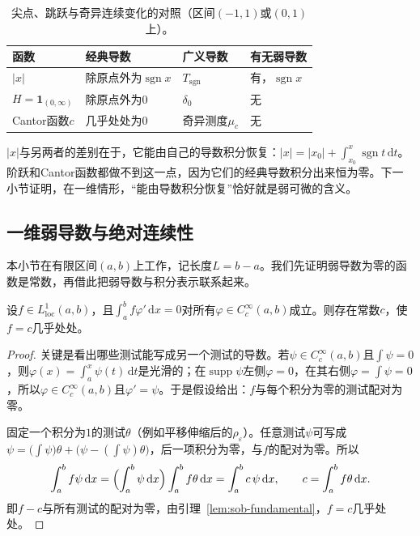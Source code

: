\begin{table}[!htb]
 \centering
 \caption{尖点、跳跃与奇异连续变化的对照（区间$(-1,1)$或$(0,1)$上）。}
 \label{tab:sob-three-examples}
 \begin{tabular}{@{}llll@{}}
  \toprule
  函数 & 经典导数 & 广义导数 & 有无弱导数\\
  \midrule
  $|x|$ & 除原点外为$\operatorname{sgn}x$ & $T_{\operatorname{sgn}}$ & 有，$\operatorname{sgn}x$\\
  $H=\mathbf 1_{(0,\infty)}$ & 除原点外为$0$ & $\delta_0$ & 无\\
  Cantor函数$c$ & 几乎处处为$0$ & 奇异测度$\mu_c$ & 无\\
  \bottomrule
 \end{tabular}
\end{table}

$|x|$与另两者的差别在于，它能由自己的导数积分恢复：$|x|=|x_0|+\int_{x_0}^x\operatorname{sgn}t\,\mathrm dt$。阶跃和Cantor函数都做不到这一点，因为它们的经典导数积分出来恒为零。下一小节证明，在一维情形，“能由导数积分恢复”恰好就是弱可微的含义。

\subsection{一维弱导数与绝对连续性}
\label{sec:sob-absolute-continuity}

本小节在有限区间$(a,b)$上工作，记长度$L=b-a$。我们先证明弱导数为零的函数是常数，再借此把弱导数与积分表示联系起来。

\begin{lemma}[弱导数为零的函数]
\label{lem:sob-zero-derivative}
设$f\in L^1_{\mathrm{loc}}(a,b)$，且$\int_a^bf\varphi'\,\mathrm dx=0$对所有$\varphi\in C_c^\infty(a,b)$成立。则存在常数$c$，使$f=c$几乎处处。
\end{lemma}

\begin{proof}
关键是看出哪些测试能写成另一个测试的导数。若$\psi\in C_c^\infty(a,b)$且$\int\psi=0$，则$\varphi(x)=\int_a^x\psi(t)\,\mathrm dt$是光滑的；在$\operatorname{supp}\psi$左侧$\varphi=0$，在其右侧$\varphi=\int\psi=0$，所以$\varphi\in C_c^\infty(a,b)$且$\varphi'=\psi$。于是假设给出：$f$与每个积分为零的测试配对为零。

固定一个积分为$1$的测试$\theta$（例如平移伸缩后的$\rho_\varepsilon$）。任意测试$\psi$可写成$\psi=\bigl(\int\psi\bigr)\theta+\bigl(\psi-(\int\psi)\theta\bigr)$，后一项积分为零，与$f$的配对为零。所以
\[
 \int_a^bf\psi\,\mathrm dx=\Bigl(\int_a^b\psi\,\mathrm dx\Bigr)\int_a^bf\theta\,\mathrm dx=\int_a^bc\,\psi\,\mathrm dx,\qquad c=\int_a^bf\theta\,\mathrm dx .
\]
即$f-c$与所有测试的配对为零，由引理~\ref{lem:sob-fundamental}，$f=c$几乎处处。
\end{proof}

